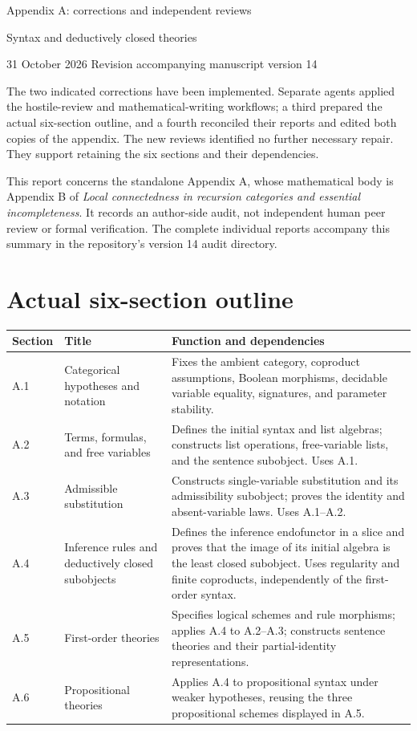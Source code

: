 \documentclass[10pt]{article}
\begin{document}
{\LARGE Appendix A: corrections and independent reviews}\par
{\large Syntax and deductively closed theories}\par
31 October 2026 \hfill Revision accompanying manuscript version 14

The two indicated corrections have been implemented. Separate agents applied
the hostile-review and mathematical-writing workflows; a third prepared the
actual six-section outline, and a fourth reconciled their reports and edited
both copies of the appendix. The new reviews identified no further necessary
repair. They support retaining the six sections and their dependencies.

This report concerns the standalone Appendix A, whose mathematical body is
Appendix B of \emph{Local connectedness in recursion categories and essential
incompleteness}. It records an author-side audit, not independent human peer
review or formal verification. The complete individual reports accompany this
summary in the repository's version 14 audit directory.

\section*{Actual six-section outline}
\renewcommand{\arraystretch}{1.16}
\begin{tabularx}{\textwidth}{@{}L{0.07\textwidth}L{0.31\textwidth}Y@{}}
\toprule
Section & Title & Function and dependencies\\\midrule
A.1 & Categorical hypotheses and notation
& Fixes the ambient category, coproduct assumptions, Boolean morphisms,
decidable variable equality, signatures, and parameter stability.\\
A.2 & Terms, formulas, and free variables
& Defines the initial syntax and list algebras; constructs list operations,
free-variable lists, and the sentence subobject. Uses A.1.\\
A.3 & Admissible substitution
& Constructs single-variable substitution and its admissibility subobject;
proves the identity and absent-variable laws. Uses A.1--A.2.\\
A.4 & Inference rules and deductively closed subobjects
& Defines the inference endofunctor in a slice and proves that the image of
its initial algebra is the least closed subobject. Uses regularity and finite
coproducts, independently of the first-order syntax.\\
A.5 & First-order theories
& Specifies logical schemes and rule morphisms; applies A.4 to A.2--A.3;
constructs sentence theories and their partial-identity representations.\\
A.6 & Propositional theories
& Applies A.4 to propositional syntax under weaker hypotheses, reusing the
three propositional schemes displayed in A.5.\\\bottomrule
\end{tabularx}
\end{document}
